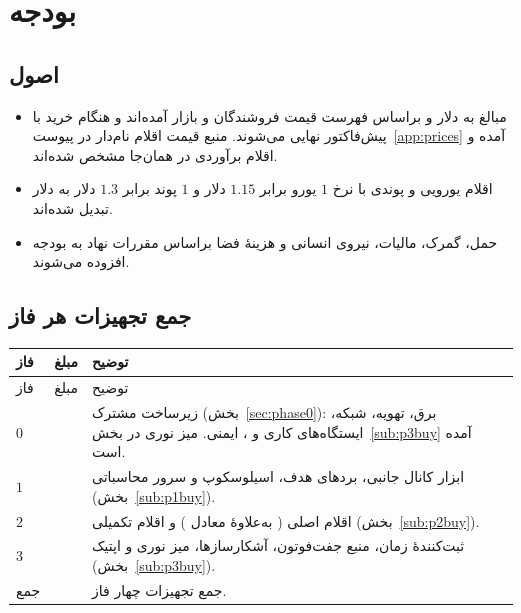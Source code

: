 \section{بودجه}
\label{sec:budget}
\subsection{اصول}
\begin{itemize}
\item مبالغ به دلار و براساس فهرست قیمت فروشندگان و بازار آمده‌اند و هنگام خرید با پیش‌فاکتور نهایی می‌شوند. منبع قیمت اقلام نام‌دار در پیوست~\ref{app:prices} آمده و اقلام برآوردی در همان‌جا مشخص شده‌اند.
\item اقلام یورویی و پوندی با نرخ $1$ یورو برابر $1.15$ دلار و $1$ پوند برابر $1.3$ دلار به دلار تبدیل شده‌اند.
\item حمل، گمرک، مالیات، نیروی انسانی و هزینهٔ فضا براساس مقررات نهاد به بودجه افزوده می‌شوند.
\end{itemize}

\subsection{جمع تجهیزات هر فاز}
\begin{longtable}{R{1.6cm}R{3.4cm}R{9.5cm}}
\toprule {} فاز & مبلغ & توضیح \\ \midrule
\endfirsthead
\toprule {} فاز & مبلغ & توضیح \\ \midrule
\endhead
$0$ &  & زیرساخت مشترک (بخش~\ref{sec:phase0}): برق، تهویه، شبکه، ایستگاه‌های کاری و ، ایمنی. میز نوری در بخش~\ref{sub:p3buy} آمده است. \\
$1$ &  & ابزار کانال جانبی، بردهای هدف، اسیلوسکوپ و سرور محاسباتی (بخش~\ref{sub:p1buy}). \\
$2$ &  & اقلام اصلی  ( به‌علاوهٔ معادل ) و اقلام تکمیلی  (بخش~\ref{sub:p2buy}). \\
$3$ &  & ثبت‌کنندهٔ زمان، منبع جفت‌فوتون، آشکارسازها، میز نوری و اپتیک (بخش~\ref{sub:p3buy}). \\
\midrule جمع &  & جمع تجهیزات چهار فاز. \\
\bottomrule\end{longtable}

